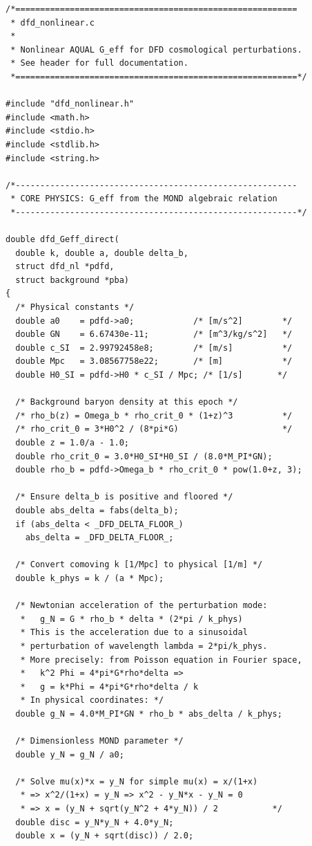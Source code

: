 \documentclass[11pt]{article}
\theoremstyle{definition}
\theoremstyle{remark}
\begin{document}
\begin{lstlisting}[caption={dfd\_nonlinear.c --- Core physics implementation},
  label={lst:impl}]
/*=========================================================
 * dfd_nonlinear.c
 *
 * Nonlinear AQUAL G_eff for DFD cosmological perturbations.
 * See header for full documentation.
 *=========================================================*/

#include "dfd_nonlinear.h"
#include <math.h>
#include <stdio.h>
#include <stdlib.h>
#include <string.h>

/*---------------------------------------------------------
 * CORE PHYSICS: G_eff from the MOND algebraic relation
 *---------------------------------------------------------*/

double dfd_Geff_direct(
  double k, double a, double delta_b,
  struct dfd_nl *pdfd,
  struct background *pba)
{
  /* Physical constants */
  double a0    = pdfd->a0;            /* [m/s^2]        */
  double GN    = 6.67430e-11;         /* [m^3/kg/s^2]   */
  double c_SI  = 2.99792458e8;        /* [m/s]          */
  double Mpc   = 3.08567758e22;       /* [m]            */
  double H0_SI = pdfd->H0 * c_SI / Mpc; /* [1/s]       */

  /* Background baryon density at this epoch */
  /* rho_b(z) = Omega_b * rho_crit_0 * (1+z)^3          */
  /* rho_crit_0 = 3*H0^2 / (8*pi*G)                     */
  double z = 1.0/a - 1.0;
  double rho_crit_0 = 3.0*H0_SI*H0_SI / (8.0*M_PI*GN);
  double rho_b = pdfd->Omega_b * rho_crit_0 * pow(1.0+z, 3);

  /* Ensure delta_b is positive and floored */
  double abs_delta = fabs(delta_b);
  if (abs_delta < _DFD_DELTA_FLOOR_)
    abs_delta = _DFD_DELTA_FLOOR_;

  /* Convert comoving k [1/Mpc] to physical [1/m] */
  double k_phys = k / (a * Mpc);

  /* Newtonian acceleration of the perturbation mode:
   *   g_N = G * rho_b * delta * (2*pi / k_phys)
   * This is the acceleration due to a sinusoidal
   * perturbation of wavelength lambda = 2*pi/k_phys.
   * More precisely: from Poisson equation in Fourier space,
   *   k^2 Phi = 4*pi*G*rho*delta =>
   *   g = k*Phi = 4*pi*G*rho*delta / k
   * In physical coordinates: */
  double g_N = 4.0*M_PI*GN * rho_b * abs_delta / k_phys;

  /* Dimensionless MOND parameter */
  double y_N = g_N / a0;

  /* Solve mu(x)*x = y_N for simple mu(x) = x/(1+x)
   * => x^2/(1+x) = y_N => x^2 - y_N*x - y_N = 0
   * => x = (y_N + sqrt(y_N^2 + 4*y_N)) / 2           */
  double disc = y_N*y_N + 4.0*y_N;
  double x = (y_N + sqrt(disc)) / 2.0;


\end{lstlisting}
\end{document}
